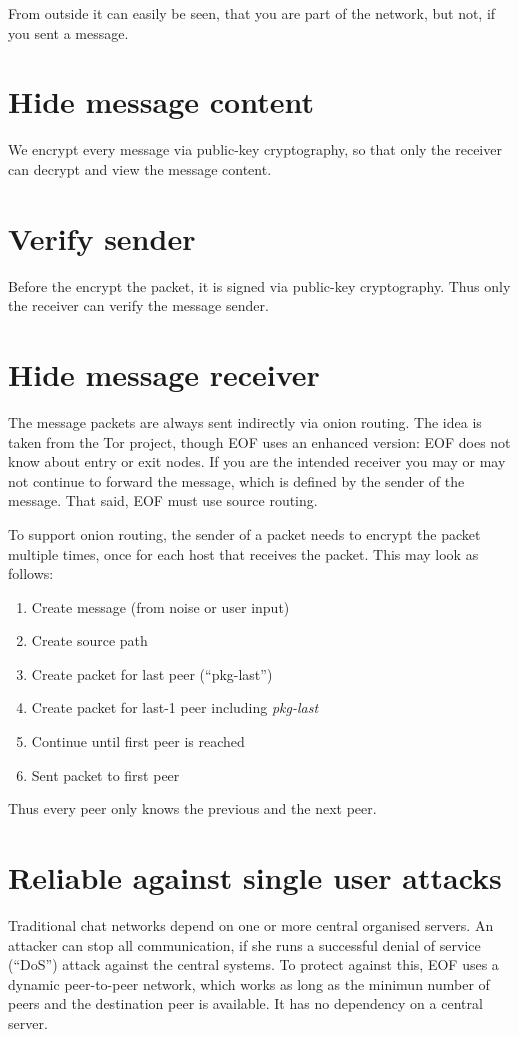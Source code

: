 From outside it can easily be seen, that you are part of the network,
but not, if you sent a message.
\section{Hide message content}
We encrypt every message via public-key cryptography\cite{pgp-1},
so that only the receiver can decrypt and view the message content.
\section{Verify sender}
Before the encrypt the packet, it is signed via public-key
cryptography\cite{pgp-1}. Thus only the receiver can verify the message sender.
\section{Hide message receiver}
The message packets are always sent indirectly via onion routing\cite{onion-1}.
The idea is taken from the Tor project\cite{tor-1}, though EOF uses an enhanced
version: EOF does not know about entry or exit nodes. If you are the intended
receiver you may or may not continue to forward the message, which is defined
by the sender of the message. That said, EOF must use source
routing\cite{source-routing-1}.

To support onion routing, the sender of a packet needs to encrypt the packet
multiple times, once for each host that receives the packet. This may look
as follows:
\begin{enumerate}
\item Create message (from noise or user input)
\item Create source path
\item Create packet for last peer ("`pkg-last"')
\item Create packet for last-1 peer including \emph{pkg-last}
\item Continue until first peer is reached
\item Sent packet to first peer
\end{enumerate}
Thus every peer only knows the previous and the next peer.
\section{Reliable against single user attacks}
Traditional chat networks depend on one or more central organised servers.
An attacker can stop all communication, if she runs a successful denial
of service ("`DoS"') attack against the central systems.
To protect against this, EOF uses a dynamic peer-to-peer network, which works
as long as the minimun number of peers and the destination peer is available.
It has no dependency on a central server.
